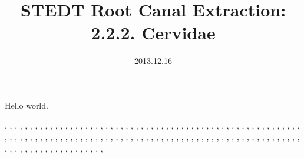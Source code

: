 \documentclass[11pt,twoside,twocolumn]{book}
\title{STEDT Root Canal Extraction:\\2.2.2. Cervidae}
\author{}
\date{2013.12.16}
\begin{document}
Hello world.

\citep{AAAM-SSM}, 
\citep{ABR1985}, 
\citep{ACH1975}, 
\citep{ACK-DTE}, 
\citep{ACK-GTL}, 
\citep{ACST}, 
\citep{AH-CSDPN}, 
\citep{AH-TND}, 
\citep{AJ-BED}, 
\citep{AM-NaLaze1}, 
\citep{Anony1959}, 
\citep{AO-diss}, 
\citep{AP-Pwo}, 
\citep{ARC-GMA}, 
\citep{ARO1980}, 
\citep{AS-ABCOC}, 
\citep{AT-MPB}, 
\citep{AT-Padam}, 
\citep{AW-CLGD}, 
\citep{AW-TBT}, 
\citep{B-ShrpaHQ}, 
\citep{BAI1909}, 
\citep{BAI1911}, 
\citep{BB-Belhare}, 
\citep{BBL-TL}, 
\citep{BDHH1971}, 
\citep{BER1965}, 
\citep{Bhat-Boro}, 
\citep{Bhat-TNL}, 
\citep{Bhat-TNV}, 
\citep{BK-AD}, 
\citep{BLBC-Khonom}, 
\citep{BM-Bah}, 
\citep{BM-Bbp}, 
\citep{BM-Hay}, 
\citep{BM-Hbp}, 
\citep{BM-Htvm}, 
\citep{BM-LH}, 
\citep{BM-Lim}, 
\citep{BM-PK7}, 
\citep{BM-PTNL}, 
\citep{BMMM-Bbp}, 
\citep{BON1930-31}, 
\citep{BOR-Sema}, 
\citep{BOR1938}, 
\citep{BP-PPWL}, 
\citep{BRO1837}, 
\citep{BRO1920}, 
\citep{BRO1951}, 
\citep{BRTMCM}, 
\citep{BS1971b}, 
\citep{BS1971c}, 
\citep{BSCH1971a}, 
\citep{BSCH1971c}, 
\citep{BSTL}, 
\citep{BUT1875}, 
\citep{CAU1969}, 
\citep{CB-SpitiQ}, 
\citep{CG-Diss}, 
\citep{CG-Dolak}, 
\citep{CG-Kath}, 
\citep{CG-NewariQ2}, 
\citep{CG-NewariQ3}, 
\citep{CHE1990}, 
\citep{CHU1867}, 
\citep{CK-CS}, 
\citep{CK-pGd}, 
\citep{CK-TujBQ}, 
\citep{CK-TujMQ}, 
\citep{CK-YiQ}, 
\citep{CLA1911}, 
\citep{COO}, 
\citep{CSL-YIzd}, 
\citep{CYS-Meithei}, 
\citep{DAP-Chm}, 
\citep{DAS-TED}, 
\citep{DB-Bisu}, 
\citep{DB-Lahu}, 
\citep{DB-Lisu}, 
\citep{DB-Ph}, 
\citep{DB-Phunoi}, 
\citep{DB-PLolo}, 
\citep{DB-Ugong}, 
\citep{DBS-PaO}, 
\citep{DC-Kucong}, 
\citep{Dell-Bai}, 
\citep{Deuri}, 
\citep{DHFRL}, 
\citep{DHR-IBWS}, 
\citep{DK-Moyon}, 
\citep{DLF-Gazhuo}, 
\citep{DM-BoroQan}, 
\citep{DM-BoroQno}, 
\citep{DM-GaroQan}, 
\citep{DM-GaroQno}, 
\citep{DM-KQan}, 
\citep{DM-KQno}, 
\citep{DM-TKQan}, 
\citep{DM-TKQno}, 
\citep{DNW-Gloss}, 
\citep{DNW-KhamQ}, 
\citep{DQ-AL}, 
\citep{DQ-Amdo}, 
\citep{DQ-Bai}, 
\citep{DQ-Batang}, 
\citep{DQ-Bola}, 
\citep{DQ-Dafang}, 
\citep{DQ-Daofu}, 
\citep{DQ-Gazhuo}, 
\citep{DQ-Hani}, 
\citep{DQ-Haoni}, 
\citep{DQ-Jiarong}, 
\citep{DQ-JinA}, 
\citep{DQ-JinB}, 
\citep{DQ-Jingpho}, 
\citep{DQ-KarenA}, 
\citep{DQ-KarenB}, 
\citep{DQ-Langsu}, 
\citep{DQ-Lashi}, 
\citep{DQ-Lolopho}, 
\citep{DQ-Naxi}, 
\citep{DQ-Nusu}, 
\citep{DQ-NusuA}, 
\citep{DQ-NusuB}, 
\citep{DQ-Nyiq}, 
\citep{DQ-QiangN}, 
\citep{DQ-Tujia}, 
\citep{DQ-Xiandao}, 
\citep{DQ-Xixia}, 
\citep{DQ-Yi (Axi)}, 
\citep{DQ-Zaiwa}, 
\citep{DRM-Tk}, 
\citep{DS-Kan}, 
\citep{DS-Kayah}, 
\citep{DS-Patt}, 
\citep{DUN1908}, 
\citep{DVB-ECD}, 
\citep{DVB-LED}, 
\end{document}

